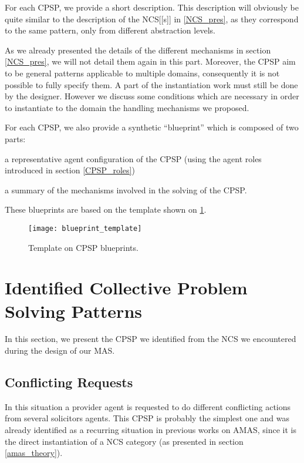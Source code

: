 For each CPSP, we provide a short description. This description will obviously be quite similar to the description of the NCS[[s]] in \ref{NCS_pres}, as they correspond to the same pattern, only from different abstraction levels.

As we already presented the details of the different mechanisms in section \ref{NCS_pres}, we will not detail them again in this part. Moreover, the CPSP aim to be general patterns applicable to multiple domains, consequently it is not possible to fully specify them. A part of the instantiation work  must still be done by the designer. However we discuss some conditions which are necessary in order to instantiate to the domain the handling mechanisms we proposed.

For each CPSP, we also provide a synthetic \enquote{blueprint} which is composed of two parts:
\begin{compactenum}
\item a representative agent configuration of the CPSP (using the agent roles introduced in section \ref{CPSP_roles}) 
\item a summary of the mechanisms involved in the solving of the CPSP.
\end{compactenum}
These blueprints are based on the template shown on \figurename{} \ref{blueprint_template}.

\begin{figure}
\centering
\texttt{[image: blueprint\_template]}
\caption{Template on CPSP blueprints.}\label{blueprint_template}
\end{figure}

\section{Identified Collective Problem Solving Patterns}

In this section, we present the CPSP we identified from the NCS we encountered during the design of our MAS.

\subsection{Conflicting Requests}

In this situation a provider agent is requested to do different conflicting actions from several solicitors agents. This CPSP is probably the simplest one and was already identified as a recurring situation in previous works on AMAS, since it is the direct instantiation of a NCS category (as presented in section \ref{amas_theory}).

